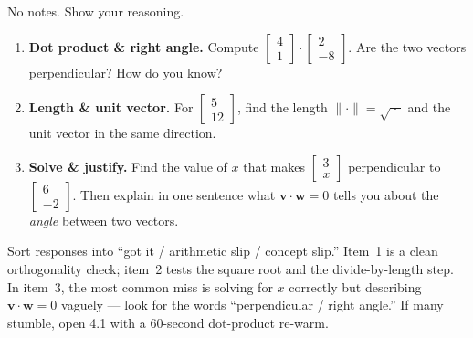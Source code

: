 \documentclass[10pt]{article}
\newcommand{\vv}{\mathbf{v}}
\newcommand{\ww}{\mathbf{w}}
\begin{document}
\namedateperiod

\vspace{0.15in}

No notes. Show your reasoning.

\begin{enumerate}[leftmargin=1.8em, itemsep=16pt]
  \item \textbf{Dot product \& right angle.} Compute
        $\begin{bmatrix} 4 \\ 1 \end{bmatrix}\cdot\begin{bmatrix} 2 \\ -8 \end{bmatrix}$.
        Are the two vectors perpendicular? How do you know?
  \item \textbf{Length \& unit vector.} For $\begin{bmatrix} 5 \\ 12 \end{bmatrix}$, find the length
        $\|\cdot\|=\sqrt{\;\cdot\;}$ and the unit vector in the same direction.
  \item \textbf{Solve \& justify.} Find the value of $x$ that makes
        $\begin{bmatrix} 3 \\ x \end{bmatrix}$ perpendicular to $\begin{bmatrix} 6 \\ -2 \end{bmatrix}$.
        Then explain in one sentence what $\vv\cdot\ww=0$ tells you about the \emph{angle} between two
        vectors.
\end{enumerate}

\begin{teachernote}
Sort responses into ``got it / arithmetic slip / concept slip.'' Item~1 is a clean orthogonality
check; item~2 tests the square root and the divide-by-length step. In item~3, the most common miss
is solving for $x$ correctly but describing $\vv\cdot\ww=0$ vaguely --- look for the words
``perpendicular / right angle.'' If many stumble, open 4.1 with a 60-second dot-product re-warm.
\end{teachernote}
\end{document}
